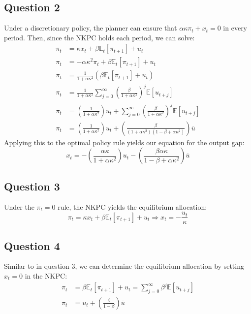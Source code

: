 \documentclass{article}
\newcommand{\E}[1]{\mathbb{E}\left[#1\right]} %
\newcommand{\Et}[1]{\mathbb{E}_t\left[#1\right]}
\begin{document}

\subsection*{Question 2}
Under a discretionary policy, the planner can ensure that ${\alpha\kappa\pi_t + x_t = 0}$ in every period. Then, since the NKPC holds each period, we can solve:
\begin{align*}
	\pi_t 	&= \kappa x_t + \beta\Et{\pi_{t+1}} + u_t																						\\
	\pi_t	&= -\alpha\kappa^2\pi_t + \beta\Et{\pi_{t+1}} + u_t																				\\
	\pi_t	&= \frac{1}{1 + \alpha\kappa^2}\left(\beta\Et{\pi_{t+1}} + u_t\right)															\\
	\pi_t	&= \frac{1}{1 + \alpha\kappa^2}\sum_{j=0}^\infty \left(\frac{\beta}{1 + \alpha\kappa^2}\right)^j\E{u_{t+j}}						\\
	\pi_t	&= \left(\frac{1}{1 + \alpha\kappa^2}\right)u_t + \sum_{j=0}^\infty \left(\frac{\beta}{1 + \alpha\kappa^2}\right)^j\E{u_{t+j}}	\\
	\pi_t	&= \left(\frac{1}{1 + \alpha\kappa^2}\right)u_t + \left(\frac{\beta}{(1 + \alpha\kappa^2)(1 -\beta + \alpha\kappa^2)}\right)\overline{u}
\end{align*}
Applying this to the optimal policy rule yields our equation for the output gap:
\[
	x_t = -\left(\frac{\alpha\kappa}{1 + \alpha\kappa^2}\right)u_t - \left(\frac{\beta\alpha\kappa}{1 -\beta + \alpha\kappa^2}\right)\overline{u}
\]




\subsection*{Question 3}
Under the $\pi_t=0$ rule, the NKPC yields the equilibrium allocation:
\[
	\pi_t = \kappa x_t + \beta\Et{\pi_{t+1}} + u_t \Rightarrow x_t = -\frac{u_t}{\kappa}
\]




\subsection*{Question 4}
Similar to in question 3, we can determine the equilibrium allocation by setting ${x_t=0}$ in the NKPC:
\begin{align*}
	\pi_t &= \beta\Et{\pi_{t+1}} + u_t = \sum_{j=0}^\infty\beta^j\E{u_{t+j}}	\\
	\pi_t &= u_t + \left(\frac{\beta}{1-\beta}\right)\overline{u}
\end{align*}
\end{document}
